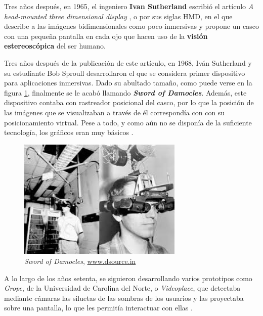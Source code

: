 Tres años después, en 1965, el ingeniero \textbf{Ivan Sutherland} escribió el artículo \textit{A head-mounted three dimensional display} \cite{suth-65}, o por sus siglas \acs{HMD}, en el que describe a las imágenes bidimensionales como poco inmersivas y propone un casco con una pequeña pantalla en cada ojo que hacen uso de la \textbf{visión estereoscópica} del ser humano.

Tres años después de la publicación de este artículo, en 1968, Iván Sutherland y su estudiante Bob Sproull desarrollaron el que se considera primer dispositivo para aplicaciones inmersivas. Dado su abultado tamaño, como puede verse en la figura \ref{fig:damocles}, finalmente se le acabó llamando \textbf{\textit{Sword of Damocles}}. Además, este dispositivo contaba con rastreador posicional del casco, por lo que la posición de las imágenes que se visualizaban a través de él correspondía con con su posicionamiento virtual. Pese a todo, y como aún no se disponía de la suficiente tecnología, los gráficos eran muy básicos \cite{lop-18}.

\vspace{0.1cm}

\begin{figure}[!h]
    \begin{center}
        \includegraphics[width=0.7\textwidth]{imagenes/2/damocles.jpg}
        \caption{\textit{Sword of Damocles}, \url{www.dsource.in}}
        \label{fig:damocles}
    \end{center}
\end{figure}

A lo largo de los años setenta, se siguieron desarrollando varios prototipos como \textit{Grope}, de la Universidad de Carolina del Norte, o \textit{Videoplace}, que detectaba mediante cámaras las siluetas de las sombras de los usuarios y las proyectaba sobre una pantalla, lo que les permitía interactuar con ellas \cite{gerv-99}.

